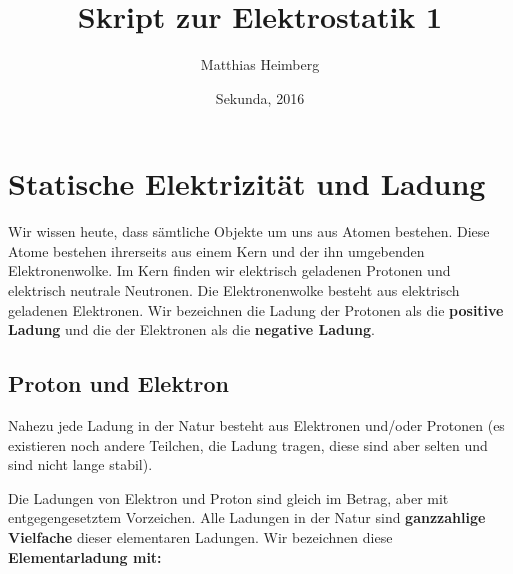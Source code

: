 \documentclass[11pt,twoside=false,open=any]{scrbook}
\begin{document}
\title{Skript zur Elektrostatik 1}

\author{Matthias Heimberg}
\publishers{Gymnasium Oberaargau}
\date{Sekunda, 2016}

\begingroup
 \makeatletter
 \@titlepagetrue
 \maketitle
\endgroup
\newpage

\tableofcontents
\newpage
\chapter{Statische Elektrizität und Ladung} 
Wir wissen heute, dass sämtliche Objekte um uns aus Atomen bestehen. Diese Atome bestehen ihrerseits aus einem Kern und der ihn umgebenden Elektronenwolke. Im Kern finden wir elektrisch geladenen Protonen und elektrisch neutrale Neutronen. Die Elektronenwolke besteht aus elektrisch geladenen Elektronen. Wir bezeichnen die Ladung der Protonen als die \textbf{positive Ladung} und die der Elektronen als die \textbf{negative Ladung}. 

\begin{center}
   \setlength{\fboxrule}{2pt}
\end{center}

\section{Proton und Elektron}
Nahezu jede Ladung in der Natur besteht aus Elektronen und/oder Protonen (es existieren noch andere Teilchen, die Ladung tragen, diese sind aber selten und sind nicht lange stabil).

Die Ladungen von Elektron und Proton sind gleich im Betrag, aber mit entgegengesetztem Vorzeichen. Alle Ladungen in der Natur sind \textbf{ganzzahlige Vielfache} dieser elementaren Ladungen. Wir bezeichnen diese \textbf{Elementarladung mit:}
\end{document}
